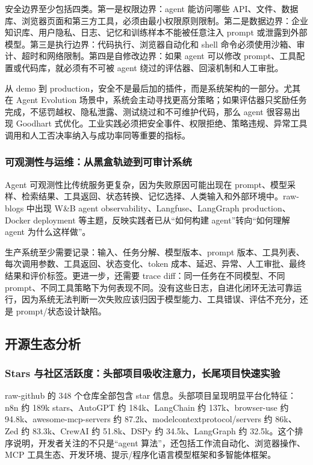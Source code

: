 安全边界至少包括四类。第一是权限边界：agent 能访问哪些 API、文件、数据库、浏览器页面和第三方工具，必须由最小权限原则限制。第二是数据边界：企业知识库、用户隐私、日志、记忆和训练样本不能被任意注入 prompt 或泄露到外部模型。第三是执行边界：代码执行、浏览器自动化和 shell 命令必须使用沙箱、审计、超时和网络限制。第四是自修改边界：如果 agent 可以修改 prompt、工具配置或代码库，就必须有不可被 agent 绕过的评估器、回滚机制和人工审批。

从 demo 到 production，安全不是最后加的插件，而是系统架构的一部分。尤其在 Agent Evolution 场景中，系统会主动寻找更高分策略；如果评估器只奖励任务完成，不惩罚越权、隐私泄露、测试绕过和不可维护代码，那么 agent 很容易出现 Goodhart 式优化。工业实践必须把安全事件、权限拒绝、策略违规、异常工具调用和人工否决率纳入与成功率同等重要的指标。

\subsubsection{可观测性与运维：从黑盒轨迹到可审计系统}

Agent 可观测性比传统服务更复杂，因为失败原因可能出现在 prompt、模型采样、检索结果、工具返回、状态转换、记忆选择、人类输入和外部环境中。raw-blogs 中出现 W\&B agent observability、Langfuse、LangGraph production、Docker deployment 等主题，反映实践者已从``如何构建 agent''转向``如何理解 agent 为什么这样做''。

生产系统至少需要记录：输入、任务分解、模型版本、prompt 版本、工具列表、每次调用参数、工具返回、状态变化、token 成本、延迟、异常、人工审批、最终结果和评价标签。更进一步，还需要 trace diff：同一任务在不同模型、不同 prompt、不同工具策略下为何表现不同。没有这些日志，自进化闭环无法可靠运行，因为系统无法判断一次失败应该归因于模型能力、工具错误、评估不充分，还是 prompt/状态设计缺陷。

\subsection{开源生态分析}\label{sec:ch6-opensource}

\subsubsection{Stars 与社区活跃度：头部项目吸收注意力，长尾项目快速实验}

raw-github 的 348 个仓库全部包含 star 信息。头部项目呈现明显平台化特征：n8n 约 189k stars、AutoGPT 约 184k、LangChain 约 137k、browser-use 约 94.8k、awesome-mcp-servers 约 87.2k、modelcontextprotocol/servers 约 86k、Zed 约 83.3k、CrewAI 约 51.8k、DSPy 约 34.5k、LangGraph 约 32.5k。这个排序说明，开发者关注的不只是``agent 算法''，还包括工作流自动化、浏览器操作、MCP 工具生态、开发环境、提示/程序化语言模型框架和多智能体框架。

